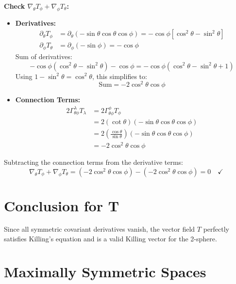 \documentclass[11pt, a4paper]{report}
\begin{document}
\textbf{Check \(\nabla_\theta T_\phi + \nabla_\phi T_\theta\):}
\begin{itemize}
    \item \textbf{Derivatives:}
    \begin{align*}
    \partial_\theta T_\phi &= \partial_\theta(-\sin\theta\cos\theta\cos\phi) = -\cos\phi [\cos^2\theta - \sin^2\theta] \\
    \partial_\phi T_\theta &= \partial_\phi(-\sin\phi) = -\cos\phi
    \end{align*}
    Sum of derivatives:
    \begin{equation*}
    -\cos\phi(\cos^2\theta - \sin^2\theta) - \cos\phi = -\cos\phi(\cos^2\theta - \sin^2\theta + 1)
    \end{equation*}
    Using $1 - \sin^2\theta = \cos^2\theta$, this simplifies to:
    \begin{equation}
    \text{Sum} = -2\cos^2\theta\cos\phi
    \end{equation}

    \item \textbf{Connection Terms:}
    \begin{align*}
    2\Gamma^\lambda_{\theta\phi} T_\lambda &= 2 \Gamma^\phi_{\theta\phi} T_\phi \\
    &= 2 (\cot\theta) (-\sin\theta\cos\theta\cos\phi) \\
    &= 2 \left(\frac{\cos\theta}{\sin\theta}\right) (-\sin\theta\cos\theta\cos\phi) \\
    &= -2 \cos^2\theta \cos\phi
    \end{align*}
\end{itemize}

Subtracting the connection terms from the derivative terms:
\begin{equation}
\nabla_\theta T_\phi + \nabla_\phi T_\theta = (-2\cos^2\theta\cos\phi) - (-2\cos^2\theta\cos\phi) = 0 \quad \checkmark
\end{equation}

\section*{Conclusion for T}
Since all symmetric covariant derivatives vanish, the vector field $T$ perfectly satisfies Killing's equation and is a valid Killing vector for the 2-sphere.\section{Maximally Symmetric Spaces}
\end{document}
